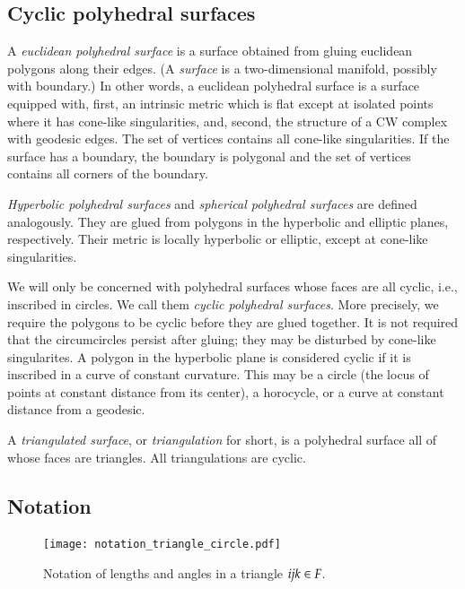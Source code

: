 \documentclass[Thesis]{subfiles}
\begin{document}
\subsection{Cyclic polyhedral surfaces }

A \emph{euclidean polyhedral surface} is a surface obtained from
gluing euclidean polygons along their edges. (A \emph{surface} is a
two-dimensional manifold, possibly with boundary.)  In other words, a
euclidean polyhedral surface is a surface equipped with, first, an
intrinsic metric which is flat except at isolated points where it has
cone-like singularities, and, second, the structure of a CW complex
with geodesic edges. The set of vertices contains all cone-like
singularities. If the surface has a boundary, the boundary is
polygonal and the set of vertices contains all corners of the
boundary.

\emph{Hyperbolic polyhedral surfaces} and \emph{spherical polyhedral
surfaces} are defined analogously. They are glued from polygons in
the hyperbolic and elliptic planes, respectively. Their metric is
locally hyperbolic or elliptic, except at cone-like singularities.

We will only be concerned with polyhedral surfaces whose faces are all
cyclic, i.e., inscribed in circles. We call them \emph{cyclic
polyhedral surfaces}. More precisely, we require the polygons to be
cyclic before they are glued together. It is not required that the
circumcircles persist after gluing; they may be disturbed by cone-like
singularites. A polygon in the hyperbolic plane is considered cyclic
if it is inscribed in a curve of constant curvature. This may be a
circle (the locus of points at constant distance from its center), a
horocycle, or a curve at constant distance from a geodesic.

A \emph{triangulated surface}, or \emph{triangulation} for short, is a
polyhedral surface all of whose faces are triangles.  All
triangulations are cyclic.

\subsection{Notation}
\label{sec:notation}

\begin{figure}
\centering
\texttt{[image: notation\_triangle\_circle.pdf]}
\caption{Notation of lengths and angles in a triangle $\it ijk \in F$.}
\label{fig:triangle_notation}	
\end{figure}
\end{document}
